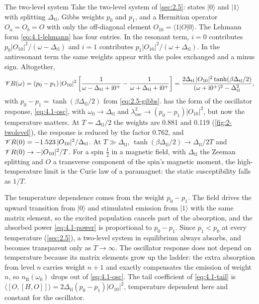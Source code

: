 \begin{workedexample}{The two-level system}\label{we:4-twolevel}
Take the two-level system of \cref{sec:2.5}: states $|0\rangle$ and $|1\rangle$ with splitting $\Delta_{\mathrm{tl}}$, Gibbs weights $p_0$ and $p_1$, and a Hermitian operator $O_a = O_b = O$ with only the off-diagonal element $O_{10} = \langle 1|O|0\rangle$. The Lehmann form \cref{eq:4.1-lehmann} has four entries. In the resonant term, $i = 0$ contributes $p_0|O_{10}|^2/(\omega - \Delta_{\mathrm{tl}})$ and $i = 1$ contributes $p_1|O_{10}|^2/(\omega + \Delta_{\mathrm{tl}})$. In the antiresonant term the same weights appear with the poles exchanged and a minus sign. Altogether,
\begin{equation}
  \mathscr{V} R(\omega) = (p_0 - p_1)\,|O_{10}|^2\left[\frac{1}{\omega - \Delta_{\mathrm{tl}} + \mathrm{i}0^+} - \frac{1}{\omega + \Delta_{\mathrm{tl}} + \mathrm{i}0^+}\right]
  = \frac{2\Delta_{\mathrm{tl}}\,|O_{10}|^2\tanh(\beta\Delta_{\mathrm{tl}}/2)}{(\omega + \mathrm{i}0^+)^2 - \Delta_{\mathrm{tl}}^2} ,
  \label{eq:4.1-twolevel}
\end{equation}
with $p_0 - p_1 = \tanh(\beta\Delta_{\mathrm{tl}}/2)$ from \cref{eq:2.5-gibbs}.  has the form of the oscillator response, \cref{eq:4.1-osc}, with $\omega_0 \to \Delta_{\mathrm{tl}}$ and $\lambda_{\mathrm{osc}}^2 \to (p_0 - p_1)|O_{10}|^2$, but now the temperature matters. At $T = \Delta_{\mathrm{tl}}/2$ the weights are 0.881 and 0.119 (\cref{fig:2-twolevel}), the response is reduced by the factor 0.762, and $\mathscr{V} R(0) = -1.523\,|O_{10}|^2/\Delta_{\mathrm{tl}}$. At $T \gg \Delta_{\mathrm{tl}}$, $\tanh(\beta\Delta_{\mathrm{tl}}/2) \to \Delta_{\mathrm{tl}}/2T$ and $\mathscr{V} R(0) \to -|O_{10}|^2/T$. For a spin $\tfrac12$ in a magnetic field, with $\Delta_{\mathrm{tl}}$ the Zeeman splitting and $O$ a transverse component of the spin's magnetic moment, the high-temperature limit is the Curie law of a paramagnet: the static susceptibility falls as $1/T$.

The temperature dependence comes from the weight $p_0 - p_1$. The field drives the upward transition from $|0\rangle$ and stimulated emission from $|1\rangle$ with the same matrix element, so the excited population cancels part of the absorption, and the absorbed power \cref{eq:4.1-power} is proportional to $p_0 - p_1$. Since $p_1 < p_0$ at every temperature (\cref{sec:2.5}), a two-level system in equilibrium always absorbs, and becomes transparent only as $T \to \infty$. The oscillator response does not depend on temperature because its matrix elements grow up the ladder: the extra absorption from level $n$ carries weight $n + 1$ and exactly compensates the emission of weight $n$, so $n_{\mathrm{B}}(\omega_0)$ drops out of \cref{eq:4.1-osc}. The tail coefficient of \cref{eq:4.1-tail} is $\langle[O, [H, O]]\rangle = 2\Delta_{\mathrm{tl}}(p_0 - p_1)|O_{10}|^2$, temperature dependent here and constant for the oscillator.


\end{workedexample}

